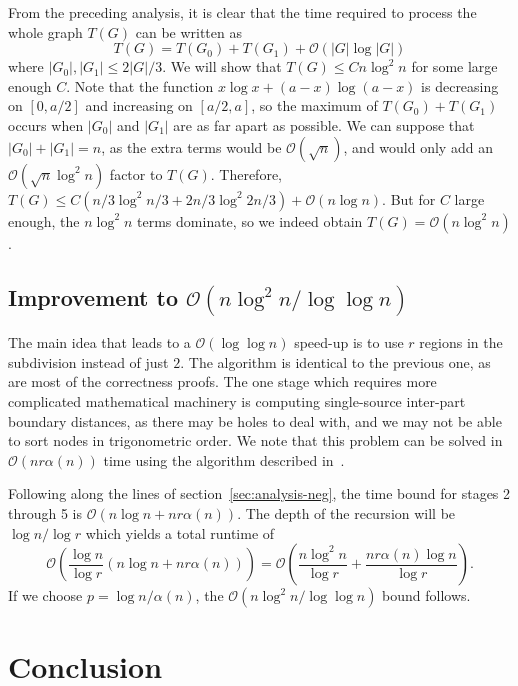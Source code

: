 \documentclass[11pt]{article}
\begin{document}
From the preceding analysis, it is clear that the time required to process the whole graph $T(G)$ can be written as 
\[
  T(G) = T(G_0) + T(G_1) + \mathcal{O}(|G| \log |G|)
\]
where $|G_0|, |G_1|\leq 2|G|/3$. We will show that $T(G) \leq Cn \log^2 n$ for some large enough $C$. Note that the function $x\log x + (a-x)\log (a-x)$ is decreasing on $[0,a/2]$ and increasing on $[a/2,a]$, so the maximum of $T(G_0)+T(G_1)$ occurs when $|G_0|$ and $|G_1|$ are as far apart as possible. We can suppose that $|G_0|+|G_1| = n$, as the extra terms would be $\mathcal{O}(\sqrt{n})$, and would only add an $\mathcal{O}(\sqrt{n}\log^2 n)$ factor to $T(G)$. Therefore, $T(G)\leq C(n/3\log^2 n/3 + 2n/3\log^2 2n/3) + \mathcal{O}(n\log n)$. But for $C$ large enough, the $n \log^2 n$ terms dominate, so we indeed obtain $T(G) = \mathcal{O}(n\log^2 n)$.


\subsection{Improvement to $\mathcal{O}(n\log^2 n/\log \log n)$}
\label{sec:impr-mathc-nlog}

The main idea that leads to a $\mathcal{O}(\log \log n)$ speed-up is to use $r$ regions in the subdivision instead of just $2$. The algorithm is identical to the previous one, as are most of the correctness proofs. The one stage which requires more complicated mathematical machinery is computing single-source inter-part boundary distances, as there may be holes to deal with, and we may not be able to sort nodes in trigonometric order. We note that this problem can be solved in $\mathcal{O}(nr\alpha(n))$ time using the algorithm described in~\cite{klawe1990almost}.

Following along the lines of section~\ref{sec:analysis-neg}, the time bound for stages 2 through 5 is $\mathcal{O}(n \log n + nr \alpha(n))$. The depth of the recursion will be $\log n/ \log r$ which yields a total runtime of
\[
  \mathcal{O}\left(\frac{\log n}{\log r}(n \log n + nr\alpha(n))\right) = \mathcal{O}\left(\frac{n\log^2 n}{\log r} + \frac{nr\alpha(n) \log n}{\log r}\right).
\]
If we choose $p=\log n/\alpha(n)$, the $\mathcal{O}(n\log^2 n/\log \log n)$ bound follows.

\section{Conclusion}
\label{sec:conclusion}
\end{document}
